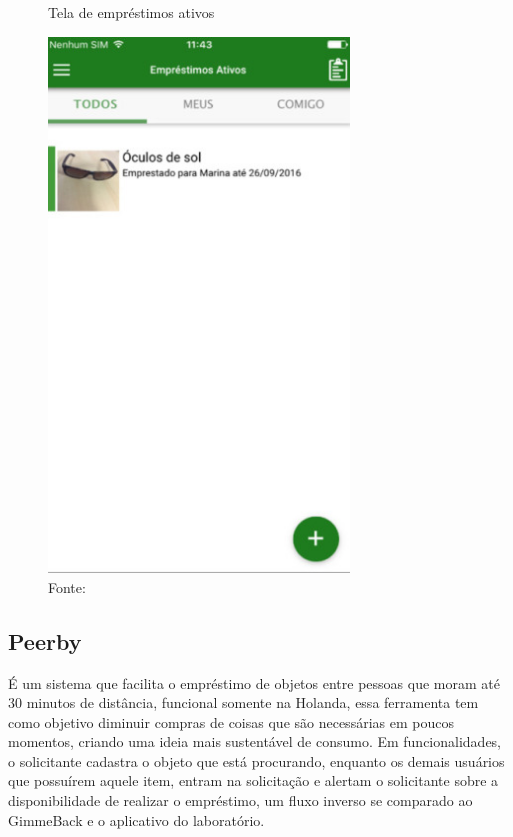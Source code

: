     \begin{figure}[h]
    \caption{Tela de empréstimos ativos}
    \centering %
    \includegraphics[width=8cm]{imagem/gimmeback-img.jpeg}
    \caption*{Fonte: \cite{MOBILE2016}}
    \label{figura:gimmeback}
    \end{figure}
    
    \subsection{Peerby}
    
    É um sistema que facilita o empréstimo de objetos entre pessoas que moram até 30 minutos de distância, funcional somente na Holanda, essa ferramenta tem como objetivo diminuir compras de coisas que são necessárias em poucos momentos, criando uma ideia mais sustentável de consumo. Em funcionalidades, o solicitante cadastra o objeto que está procurando, enquanto os demais usuários que possuírem aquele item, entram na solicitação e alertam o solicitante sobre a disponibilidade de realizar o empréstimo, um fluxo inverso se comparado ao GimmeBack e o aplicativo do laboratório.
    
